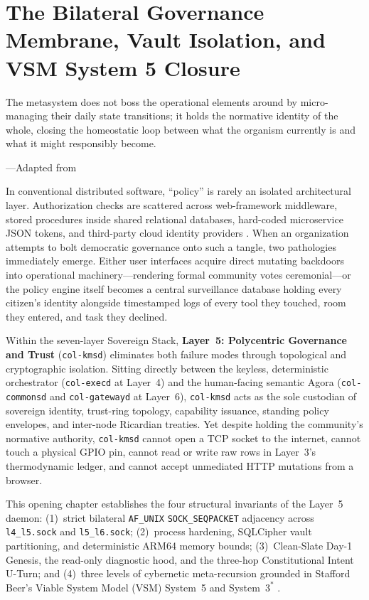\chapter{The Bilateral Governance Membrane, Vault Isolation, and VSM System 5 Closure}
\label{ch:l5-bilateral-membrane}

\epigraph{The metasystem does not boss the operational elements around by micro-managing their daily state transitions; it holds the normative identity of the whole, closing the homeostatic loop between what the organism currently is and what it might responsibly become.}{---Adapted from \textcite{beer1979}}

In conventional distributed software, ``policy'' is rarely an isolated architectural layer.
Authorization checks are scattered across web-framework middleware, stored procedures inside
shared relational databases, hard-coded microservice JSON tokens, and third-party cloud
identity providers \parencite{saltzer1975protection,rose2020zero}. When an organization
attempts to bolt democratic governance onto such a tangle, two pathologies immediately emerge.
Either user interfaces acquire direct mutating backdoors into operational machinery---rendering
formal community votes ceremonial---or the policy engine itself becomes a central surveillance
database holding every citizen's identity alongside timestamped logs of every tool they
touched, room they entered, and task they declined.

Within the seven-layer Sovereign Stack, \textbf{Layer~5: Polycentric Governance and Trust}
(\texttt{col-kmsd}) eliminates both failure modes through topological and cryptographic
isolation. Sitting directly between the keyless, deterministic orchestrator (\texttt{col-execd}
at Layer~4) and the human-facing semantic Agora (\texttt{col-commonsd} and
\texttt{col-gatewayd} at Layer~6), \texttt{col-kmsd} acts as the sole custodian of sovereign
identity, trust-ring topology, capability issuance, standing policy envelopes, and inter-node
Ricardian treaties. Yet despite holding the community's normative authority, \texttt{col-kmsd}
cannot open a TCP socket to the internet, cannot touch a physical GPIO pin, cannot read or
write raw rows in Layer~3's thermodynamic ledger, and cannot accept unmediated HTTP mutations
from a browser.

This opening chapter establishes the four structural invariants of the Layer~5 daemon:
(1)~strict bilateral \texttt{AF\_UNIX} \texttt{SOCK\_SEQPACKET} adjacency across
\texttt{l4\_l5.sock} and \texttt{l5\_l6.sock}; (2)~process hardening, SQLCipher vault
partitioning, and deterministic ARM64 memory bounds; (3)~Clean-Slate Day-1 Genesis, the
read-only diagnostic hood, and the three-hop Constitutional Intent U-Turn; and (4)~three levels
of cybernetic meta-recursion grounded in Stafford Beer's Viable System Model (VSM) System~5 and
System~$3^*$ \parencite{beer1972,beer1979}.

